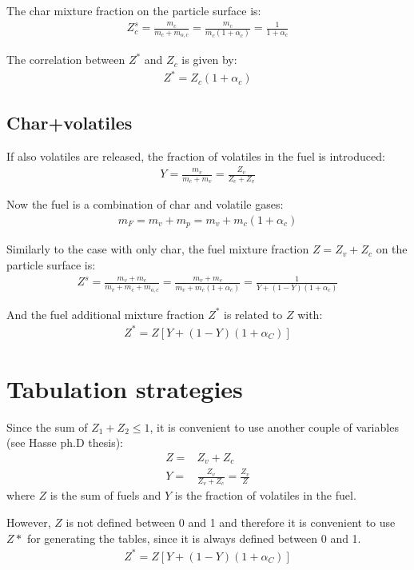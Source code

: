 \documentclass[]{scrartcl}
\begin{document}
The char mixture fraction on the particle surface is:
\begin{eqnarray}
Z_{c}^s = \frac{m_c}{m_c+m_{o,c}} = \frac{m_c}{m_c (1+\alpha_c)} = \frac{1}{1+\alpha_c}
\end{eqnarray}

The correlation between $Z^*$ and $Z_c$ is given by:
\begin{eqnarray}
Z^* = Z_c (1+\alpha_c)
\end{eqnarray}

\subsection{Char+volatiles}
If also volatiles are released, the fraction of volatiles in the fuel is introduced:
\begin{eqnarray}
Y=\frac{m_v}{m_c+m_v} = \frac{Z_v}{Z_c+Z_v} 
\end{eqnarray}

Now the fuel is a combination of char and volatile gases:
\begin{eqnarray}
m_F = m_v + m_p = m_v + m_c(1+\alpha_c)
\end{eqnarray}

Similarly to the case with only char, the fuel mixture fraction $Z=Z_v+Z_c$ on the particle surface is:
\begin{eqnarray}
Z^s = \frac{m_v + m_c}{m_v + m_c + m_{o,c}} = \frac{m_v + m_c}{m_v + m_c(1+\alpha_c)} = \frac{1}{Y+(1-Y)(1+\alpha_c)}
\end{eqnarray}

And the fuel additional mixture fraction $Z^*$ is related to $Z$ with:
\begin{eqnarray}
Z^* = Z \left[Y+(1-Y)(1+\alpha_C)\right]
\end{eqnarray}

\section{Tabulation strategies}
Since the sum of $Z_1+Z_2 \le 1$, it is convenient to use another couple of variables (see Hasse ph.D thesis):
\begin{eqnarray}
Z = & Z_v + Z_c\\
Y = & \frac{Z_v}{Z_v + Z_c} = \frac{Z_v}{Z}
\end{eqnarray}
where $Z$ is the sum of fuels and $Y$ is the fraction of volatiles in the fuel. 

However, $Z$ is not defined between 0 and 1 and therefore it is convenient to use $Z*$ for generating the tables, since it is always defined between 0 and 1.
\begin{eqnarray}
Z^* = Z \left[Y+(1-Y)(1+\alpha_C)\right]
\end{eqnarray}
\end{document}
